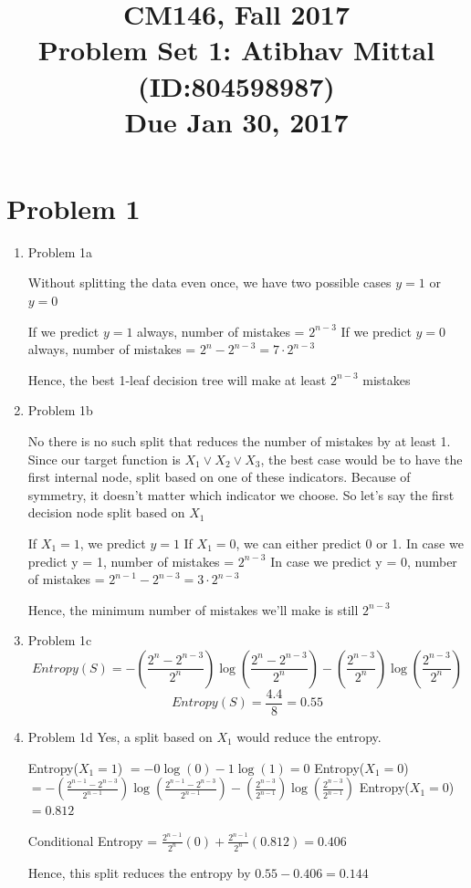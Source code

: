 \documentclass[11pt]{article}
\newcommand{\cnum}{CM146}
\newcommand{\ced}{Fall 2017}
\newcommand{\ctitle}[3]{\title{\vspace{-0.5in}\cnum, \ced\\Problem Set #1: #2\\Due #3}}
\newcommand{\solution}[1]{{{\color{blue}{\bf Solution:} {#1}}}}
\begin{document}
\ctitle{1}{Atibhav Mittal (ID:804598987)}{Jan 30, 2017}
\author{}
\date{}
\maketitle
\vspace{-0.75in}

\section{Problem 1}
\begin{enumerate}
\item Problem 1a

\solution{} \newline
Without splitting the data even once, we have two possible cases $y=1$ or $y = 0$

If we predict $y=1$ always, number of mistakes = $2^{n-3}$
If we predict $y=0$ always, number of mistakes = $2^n - 2^{n-3} = 7 \cdot 2^{n-3}$

Hence, the best 1-leaf decision tree will make at least $2^{n-3}$ mistakes

\item Problem 1b

\solution{} \newline
No there is no such split that reduces the number of mistakes by at least 1. 
Since our target function is $X_{1} \lor X_{2} \lor X_{3}$, the best case would be to 
have the first internal node, split based on one of these indicators. 
Because of symmetry, it doesn't matter which indicator we choose. 
So let's say the first decision node split based on $X_{1}$

If $X_{1} = 1$, we predict $y=1$
If $X_{1} = 0$, we can either predict 0 or 1.
In case we predict y = 1, number of mistakes = $2^{n-3}$
In case we predict y = 0, number of mistakes = $2^{n-1} - 2^{n-3} = 3 \cdot 2 ^{n-3}$

Hence, the minimum number of mistakes we'll make is still $2^{n-3}$

\item Problem 1c
\solution{} 
$$
Entropy(S) = - \left( \frac{2^n - 2^{n-3}}{2^n}\right) \log \left( \frac{2^n - 2^{n-3}}{2^n}\right) - \left( \frac{2^{n-3}}{2^n} \right) \log \left( \frac{2^{n-3}}{2^n} \right)
$$
$$
Entropy(S) = \frac{4.4}{8} = 0.55
$$

\item Problem 1d
\solution{}
Yes, a split based on $X_{1}$ would reduce the entropy.

Entropy($X_{1} = 1$) $ = - 0 \log(0) - 1 \log(1) = 0$ \newline
Entropy($X_{1} = 0$) $ = - \left( \frac{2^{n-1} - 2^{n-3}}{2^{n-1}}\right) \log \left( \frac{2^{n-1} - 2^{n-3}}{2^{n-1}}\right) - \left( \frac{2^{n-3}}{2^{n-1}} \right) \log \left( \frac{2^{n-3}}{2^{n-1}} \right)$ \newline
Entropy($X_{1} = 0$) $ = 0.812$

Conditional Entropy = $\frac{2^{n-1}}{2^n} (0) + \frac{2^{n-1}}{2^n} (0.812) = 0.406$ \newline

Hence, this split reduces the entropy by $0.55 - 0.406 = 0.144$
\end{enumerate}
\end{document}
